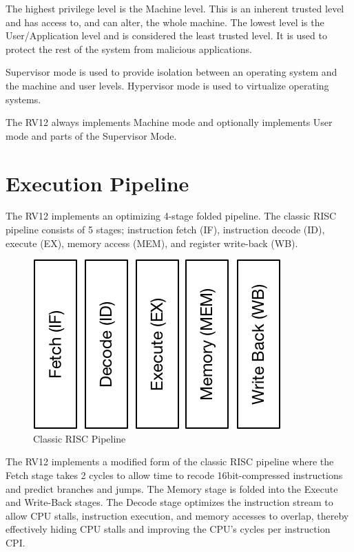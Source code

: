 The highest privilege level is the Machine level. 
This is an inherent trusted level and has access to, and can alter, the whole machine. 
The lowest level is the User/Application level and is considered the least trusted level. 
It is used to protect the rest of the system from malicious applications.

Supervisor mode is used to provide isolation between an operating system and the machine and user levels. 
Hypervisor mode is used to virtualize operating systems.

The RV12 always implements Machine mode and optionally implements User mode and parts of the Supervisor Mode.

\section{Execution Pipeline}\label{execution-pipeline}

The RV12 implements an optimizing 4-stage folded pipeline. 
The classic RISC pipeline consists of 5 stages; instruction fetch (IF), instruction decode (ID), execute (EX), memory access (MEM), and register write-back (WB).

\begin{figure}[hbt]
  \includegraphics{assets/img/Pipeline-Reg}
  \caption{Classic RISC Pipeline}
\end{figure}

The RV12 implements a modified form of the classic RISC pipeline where the Fetch stage takes 2 cycles to allow time to recode 16bit-compressed instructions and predict branches and jumps. 
The Memory stage is folded into the Execute and Write-Back stages. 
The Decode stage optimizes the instruction stream to allow CPU stalls, instruction execution, and memory accesses to overlap, thereby effectively hiding CPU stalls and improving the CPU's cycles per instruction CPI.

